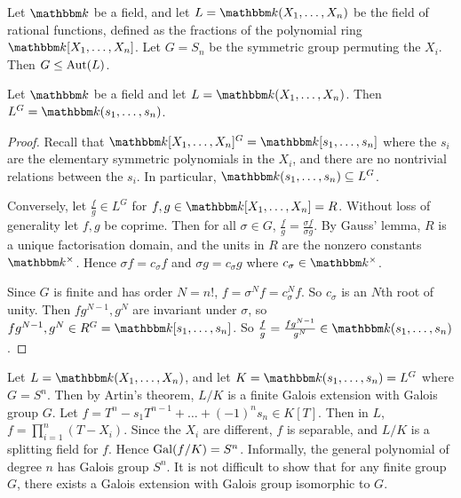 \begin{example}
	Let \( \mathbbm k \) be a field, and let \( L = \mathbbm k(X_1, \dots, X_n) \) be the field of rational functions, defined as the fractions of the polynomial ring \( \mathbbm k[X_1, \dots, X_n] \).
	Let \( G = S_n \) be the symmetric group permuting the \( X_i \).
	Then \( G \leq \operatorname{Aut}(L) \).
\end{example}
\begin{theorem}
	Let \( \mathbbm k \) be a field and let \( L = \mathbbm k(X_1, \dots, X_n) \).
	Then \( L^G = \mathbbm k(s_1, \dots, s_n) \).
\end{theorem}
\begin{proof}
	Recall that \( \mathbbm k[X_1, \dots, X_n]^G = \mathbbm k[s_1, \dots, s_n] \) where the \( s_i \) are the elementary symmetric polynomials in the \( X_i \), and there are no nontrivial relations between the \( s_i \).
	In particular, \( \mathbbm k(s_1, \dots, s_n) \subseteq L^G \).

	Conversely, let \( \frac{f}{g} \in L^G \) for \( f, g \in \mathbbm k[X_1, \dots, X_n] = R \).
	Without loss of generality let \( f, g \) be coprime.
	Then for all \( \sigma \in G \), \( \frac{f}{g} = \frac{\sigma f}{\sigma g} \).
	By Gauss' lemma, \( R \) is a unique factorisation domain, and the units in \( R \) are the nonzero constants \( \mathbbm k^\times \).
	Hence \( \sigma f = c_\sigma f \) and \( \sigma g = c_\sigma g \) where \( c_\sigma \in \mathbbm k^\times \).

	Since \( G \) is finite and has order \( N = n! \), \( f = \sigma^N f = c_\sigma^N f \).
	So \( c_\sigma \) is an \( N \)th root of unity.
	Then \( fg^{N-1}, g^N \) are invariant under \( \sigma \), so \( fg^{N-1}, g^N \in R^G = \mathbbm k[s_1, \dots, s_n] \).
	So \( \frac{f}{g} = \frac{fg^{N-1}}{g^N} \in \mathbbm k(s_1, \dots, s_n) \).
\end{proof}
\begin{example}
	Let \( L = \mathbbm k(X_1, \dots, X_n) \), and let \( K = \mathbbm k(s_1, \dots, s_n) = L^G \) where \( G = S^n \).
	Then by Artin's theorem, \( L/K \) is a finite Galois extension with Galois group \( G \).
	Let \( f = T^n - s_1 T^{n-1} + \dots + (-1)^n s_n \in K[T] \).
	Then in \( L \), \( f = \prod_{i=1}^n (T - X_i) \).
	Since the \( X_i \) are different, \( f \) is separable, and \( L / K \) is a splitting field for \( f \).
	Hence \( \operatorname{Gal}(f/K) = S^n \).
	Informally, the general polynomial of degree \( n \) has Galois group \( S^n \).
	It is not difficult to show that for any finite group \( G \), there exists a Galois extension with Galois group isomorphic to \( G \).
\end{example}

